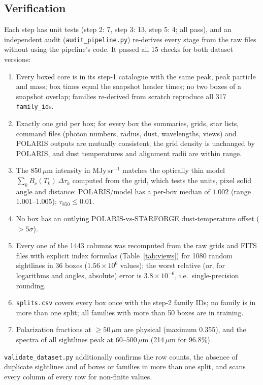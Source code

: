 \subsection{Verification}
\label{sec:dataset:verification}

Each step has unit tests (step 2: 7, step 3: 13, step 5: 4; all pass), and an independent audit
(\texttt{audit\_pipeline.py}) re-derives every stage from the raw files without using the pipeline's code. It
passed all 15 checks for both dataset versions:
\begin{enumerate}
  \item Every boxed core is in its step-1 catalogue with the same peak, peak particle and mass; box times equal
  the snapshot header times; no two boxes of a snapshot overlap; families re-derived from scratch reproduce all
  317 \texttt{family\_id}s.
  \item Exactly one grid per box; for every box the summaries, grids, star lists, command files (photon numbers,
  radius, dust, wavelengths, views) and POLARIS outputs are mutually consistent, the grid density is unchanged by
  POLARIS, and dust temperatures and alignment radii are within range.
  \item The $850\,\mu\mathrm{m}$ intensity in $\mathrm{MJy\,sr^{-1}}$ matches the optically thin model
  $\sum_k B_\nu(T_k)\,\Delta\tau_k$ computed from the grid, which tests the units, pixel solid angle and distance:
  POLARIS/model has a per-box median of $1.002$ (range $1.001$--$1.005$); $\tau_{850}\le0.01$.
  \item No box has an outlying POLARIS-vs-STARFORGE dust-temperature offset ($>5\sigma$).
  \item Every one of the 1443 columns was recomputed from the raw grids and FITS files with explicit index formulas
  (Table~\ref{tab:views}) for 1080 random sightlines in 36 boxes ($1.56\times10^{6}$ values); the worst
  relative (or, for logarithms and angles, absolute) error is $3.8\times10^{-6}$, i.e.\ single-precision rounding.
  \item \texttt{splits.csv} covers every box once with the step-2 family IDs; no family is in more than one split;
  all families with more than 50 boxes are in training.
  \item Polarization fractions at $\ge50\,\mu\mathrm{m}$ are physical (maximum 0.355), and the spectra of all
  sightlines peak at 60--$500\,\mu\mathrm{m}$ (214\,$\mu$m for 96.8\%).
\end{enumerate}
\texttt{validate\_dataset.py} additionally confirms the row counts, the absence of duplicate sightlines and of
boxes or families in more than one split, and scans every column of every row for non-finite values.


